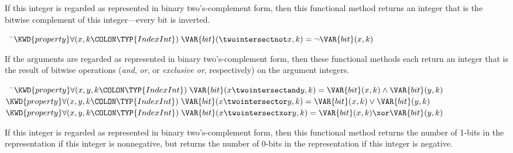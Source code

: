 If this integer is regarded as represented in binary two's-complement form,
then this functional method returns an integer that is the bitwise complement
of this integer---every bit is inverted.

\begin{Fortress}
{\tt~~}\pushtabs\=\+\(  \KWD{property} \forall(x, k\COLON \TYP{IndexInt})\; \VAR{bit}(\twointersectnot x, k) = \neg \VAR{bit}(x, k)\)\-\\\poptabs
\end{Fortress}



If the arguments are regarded as represented in binary two's-complement form,
then these functional methods each return an integer that is the result
of bitwise operations (\emph{and}, \emph{or}, or \emph{exclusive or}, respectively)
on the argument integers.

\begin{Fortress}
{\tt~~}\pushtabs\=\+\(  \KWD{property} \forall(x, y, k\COLON \TYP{IndexInt})\; \VAR{bit}(x \twointersectand y, k) = \VAR{bit}(x, k) \wedge \VAR{bit}(y, k)\)\\
\(  \KWD{property} \forall(x, y, k\COLON \TYP{IndexInt})\; \VAR{bit}(x \twointersector y, k) = \VAR{bit}(x, k) \vee \VAR{bit}(y, k)\)\\
\(  \KWD{property} \forall(x, y, k\COLON \TYP{IndexInt})\; \VAR{bit}(x \twointersectxor y, k) = \VAR{bit}(x, k) \xor \VAR{bit}(y, k)\)\-\\\poptabs
\end{Fortress}



If this integer is regarded as represented in binary two's-complement form,
then this functional method returns the number of 1-bits in the representation
if this integer is nonnegative, but returns the number of 0-bits in the representation
if this integer is negative.

